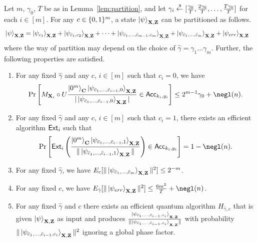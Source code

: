 \begin{lemma}\label{lem:partition_further}
Let $m$, $\gamma_0$, $T$ be as in Lemma~\ref{lem:partition}, and let $\gamma_i\overset{\hspace{0.1em}\mathsf{\scriptscriptstyle\$}}{\leftarrow} [\frac{\gamma_0}{T},\frac{2\gamma_0}{T},\dots,\frac{T\gamma_0}{T}]$ for each $i\in [m]$.
For any $c\in \{0,1\}^m$, a state $\ket{\psi}_{\mathbf{X},\mathbf{Z}}$ can be partitioned as follows.%
\begin{align*}
    & \ket{\psi}_{\mathbf{X},\mathbf{Z}} = \ket{\psi_{c_1}}_{\mathbf{X},\mathbf{Z}} + \ket{\psi_{\bar{c}_1,c_2}}_{\mathbf{X},\mathbf{Z}} + \cdots +\ket{\psi_{\bar{c}_1,\dots,\bar{c}_{m-1},c_m}}_{\mathbf{X},\mathbf{Z}} + \ket{\psi_{\bar{c}_1,\dots,\bar{c}_m}}_{\mathbf{X},\mathbf{Z}}+ \ket{\psi_{err}}_{\mathbf{X},\mathbf{Z}}
\end{align*}
where the way of partition may depend on the choice of $\hat{\gamma}=\gamma_1...\gamma_m$.
Further, the following properties are satisfied. 
\begin{enumerate}
    \item For any fixed $\hat{\gamma}$ and any $c$, $i\in [m]$ such that $c_i=0$, we have 
    \begin{align*}
    \Pr\left[M_{\regX_i}\circ U \frac{\ket{0^m}_{\regC}\ket{\psi_{\bar{c}_1,\dots,\bar{c}_{i-1},0}}_{\regX,\regZ}}{|\ket{\psi_{\bar{c}_1,\dots,\bar{c}_{i-1},0}}_{\regX,\regZ}|}\in \Acc_{k_i,y_i}\right]\leq 2^{m-1}\gamma_0+ \negl(\secpar).
    \end{align*}
    
    \item For any fixed $\hat{\gamma}$ and any $c$, $i\in[m]$ such that $c_i=1$, there exists an efficient algorithm $\mathsf{Ext}_i$ such that 
    \begin{align*}  
  \Pr\left[\ext_i\left(\frac{\ket{0^m}_{\regC}\ket{\psi_{\bar{c}_1,\dots,\bar{c}_{i-1},1}}_{\regX,\regZ}}{\|\ket{\psi_{\bar{c}_1,\dots,\bar{c}_{i-1},1}}_{\regX,\regZ}\|}\right)\in \Acc_{k_i,y_i}\right]=1-\negl(\secpar).
  \end{align*}   
  \item For any fixed $\hat{\gamma}$, we have $E_c[\|\ket{\psi_{\bar{c}_1,\dots,\bar{c}_m}}_{\mathbf{X},\mathbf{Z}}\|^2] \leq 2^{-m}$.
\item For any fixed $c$, we have $E_{\hat{\gamma}}[\|\ket{\psi_{err}}_{\regX,\regZ}\|^2]\leq \frac{6m^2}{T}+\negl(\secpar)$.
    \item For any fixed $\hat{\gamma}$ and $c$ there exists an efficient quantum algorithm $H_{\hat{\gamma},c}$ that is given $\ket{\psi}_{\mathbf{X},\mathbf{Z}}$ as input and produces  $\frac{\ket{\psi_{\bar{c}_1,\dots,\bar{c}_{i-1},c_i}}_{\mathbf{X},\mathbf{Z}}}{\|\ket{\psi_{\bar{c}_1,\dots,\bar{c}_{i-1},c_i}}_{\mathbf{X},\mathbf{Z}}\|}$ with probability $\|\ket{\psi_{\bar{c}_1,\dots,\bar{c}_{i-1},c_i}}_{\mathbf{X},\mathbf{Z}}\|^2$ ignoring a global phase factor.
\end{enumerate}
\end{lemma}
